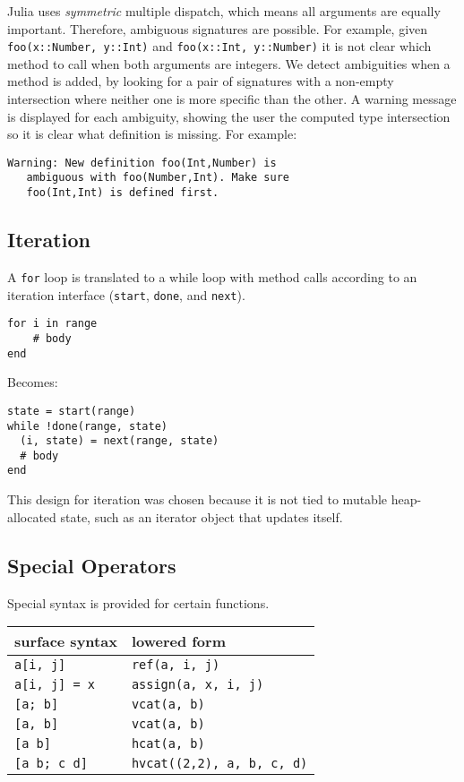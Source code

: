 \documentclass[9pt]{sigplanconf}
\begin{document}
Julia uses \emph{symmetric} multiple dispatch, which means all arguments
are equally important. Therefore, ambiguous signatures are possible.
For example, given {\tt foo(x::Number, y::Int)} and
{\tt foo(x::Int, y::Number)} it is not clear which method to call when both
arguments are integers. We detect ambiguities when a method is added, by
looking for a pair of signatures with a non-empty intersection where neither
one is more specific than the other. A warning message is displayed for each
ambiguity, showing the user the computed type intersection so it is clear what
definition is missing. For example:

\begin{verbatim}
Warning: New definition foo(Int,Number) is
   ambiguous with foo(Number,Int). Make sure
   foo(Int,Int) is defined first.
\end{verbatim}


\subsection{Iteration}

A {\tt for} loop is translated to a while loop with method calls according
to an iteration interface ({\tt start}, {\tt done}, and {\tt next}).

\begin{verbatim}
for i in range
    # body
end
\end{verbatim}

Becomes:

\begin{verbatim}
state = start(range)
while !done(range, state)
  (i, state) = next(range, state)
  # body
end
\end{verbatim}

This design for iteration was chosen because it is not tied to mutable
heap-allocated state, such as an iterator object that updates itself.

\subsection{Special Operators}

Special syntax is provided for certain functions.

\begin{tabular}{|l|l|}\hline
surface syntax     & lowered form \\\hline \hline
{\tt a[i, j]}      & {\tt ref(a, i, j)} \\\hline
{\tt a[i, j] = x}  & {\tt assign(a, x, i, j)} \\\hline
{\tt [a; b]}       & {\tt vcat(a, b)} \\\hline
{\tt [a, b]}       & {\tt vcat(a, b)} \\\hline
{\tt [a b]}        & {\tt hcat(a, b)} \\\hline
{\tt [a b; c d]}   & {\tt hvcat((2,2), a, b, c, d)}\\\hline
\end{tabular}
\end{document}
